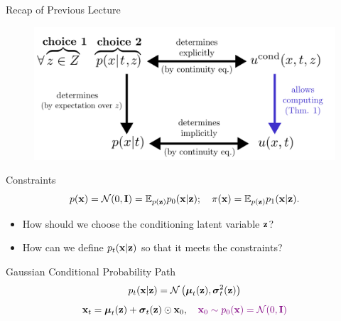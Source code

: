 \documentclass{beamer}
\begin{document}
\begin{frame}
\titlepage
	\resetonslide
\end{frame}
\begin{frame}{Recap of Previous Lecture}
	\begin{figure}
		\centering
		\includegraphics[width=0.7\linewidth]{figs/cfm_uncond_to_cond}
	\end{figure}
	\vspace{-0.3cm}
	\begin{block}{Constraints}
		\vspace{-0.3cm}
		\[
			p(\mathbf{x}) = \mathcal{N}(0, \mathbf{I}) = \mathbb{E}_{p(\mathbf{z})} p_0(\mathbf{x} | \mathbf{z}); \quad \pi(\mathbf{x}) = \mathbb{E}_{p(\mathbf{z})} p_1(\mathbf{x} | \mathbf{z}).
		\]
		\vspace{-0.5cm}
	\end{block}
	\begin{itemize}
		\item How should we choose the conditioning latent variable $\mathbf{z}$?
		\item How can we define $p_t(\mathbf{x} | \mathbf{z})$ so that it meets the constraints?
	\end{itemize}
	\begin{block}{Gaussian Conditional Probability Path}
		\vspace{-0.3cm}
		\[
			p_t(\mathbf{x} | \mathbf{z}) = \mathcal{N}\left(\boldsymbol{\mu}_t(\mathbf{z}), \boldsymbol{\sigma}_t^2(\mathbf{z})\right)
		\]
		\[
			\mathbf{x}_t = \boldsymbol{\mu}_t(\mathbf{z}) + \boldsymbol{\sigma}_t(\mathbf{z}) \odot \mathbf{x}_0, \quad {\color{violet} \mathbf{x}_0 \sim p_0(\mathbf{x}) = \mathcal{N}(0, \mathbf{I})}
		\]
	\end{block}
\end{frame}
\end{document}
